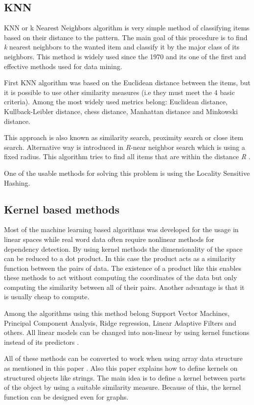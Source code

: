 \subsection{KNN}
KNN or k Nearest Neighbors algorithm is very simple method of classifying items based on their distance to the pattern. The main goal of this procedure is to find \textit{k} nearest neighbors to the wanted item and classify it by the major class of its neighbors. This method is widely used since the 1970 and its one of the first and effective methods used for data mining.

First KNN algorithm was based on the Euclidean distance between the items, but it is possible to use other similarity measures (i.e they must meet the 4 basic criteria). Among the most widely used metrics belong: Euclidean distance, Kullback-Leibler distance, chess distance, Manhattan distance and Minkowski distance.

This approach is also known as similarity search, proximity search or close item search. Alternative way is introduced in \textit{R}-near neighbor search which is using a fixed radius. This algorithm tries to find all items that are within the distance \textit{R} \cite{hashing}.

One of the usable methods for solving this problem is using the Locality Sensitive Hashing.

\subsection{Kernel based methods}
Most of the machine learning based algorithms was developed for the usage in linear spaces while real word data often require nonlinear methods for dependency detection. By using kernel methods the dimensionality of the space can be reduced to a dot product. In this case the product acts as a similarity function between the pairs of data. The existence of a product like this enables these methods to act without computing the coordinates of the data but only computing the similarity between all of their pairs. Another advantage is that it is usually cheap to compute.

Among the algorithms using this method belong Support Vector Machines, Principal Component Analysis, Ridge regression, Linear Adaptive Filters and others. All linear models can be changed into non-linear by using kernel functions instead of its predictors \cite{kernel, machineLearning}.

All of these methods can be converted to work when using array data structure as mentioned in this paper \cite{kernelArray}. Also this paper \cite{kernelstring} explains how to define kernels on structured objects like strings. The main idea is to define a kernel between parts of the object by using a suitable similarity measure. Because of this, the kernel function can be designed even for graphs.



